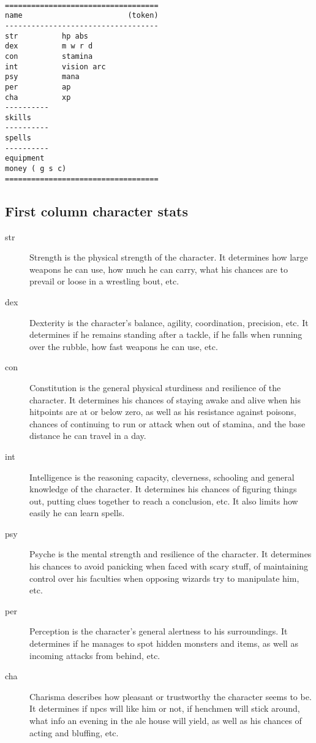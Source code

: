 \

\goodbreak
\begin{samepage} \begin{verbatim}
===================================
name                        (token)
-----------------------------------
str          hp abs
dex          m w r d
con          stamina
int          vision arc
psy          mana
per          ap
cha          xp
----------
skills
----------
spells
----------
equipment
money ( g s c)
===================================
\end{verbatim} \end{samepage}


\subsection*{First column character stats}

\begin{description}

\item[str] Strength is the physical strength of the character. It determines how large weapons he can use, how much he can carry, what his chances are to prevail or loose in a wrestling bout, etc.

\item[dex] Dexterity is the character's balance, agility, coordination, precision, etc. It determines if he remains standing after a tackle, if he falls when running over the rubble, how fast weapons he can use, etc.

\item[con] Constitution is the general physical sturdiness and resilience of the character. It determines his chances of staying awake and alive when his hitpoints are at or below zero, as well as his resistance against poisons, chances of continuing to run or attack when out of stamina, and the base distance he can travel in a day.

\item[int] Intelligence is the reasoning capacity, cleverness, schooling and general knowledge of the character. It determines his chances of figuring things out, putting clues together to reach a conclusion, etc. It also limits how easily he can learn spells.

\item[psy] Psyche is the mental strength and resilience of the character. It determines his chances to avoid panicking when faced with scary stuff, of maintaining control over his faculties when opposing wizards try to manipulate him, etc.

\item[per] Perception is the character's general alertness to his surroundings. It determines if he manages to spot hidden monsters and items, as well as incoming attacks from behind, etc.

\item[cha] Charisma describes how pleasant or trustworthy the character seems to be. It determines if npcs will like him or not, if henchmen will stick around, what info an evening in the ale house will yield, as well as his chances of acting and bluffing, etc.

\end{description}


